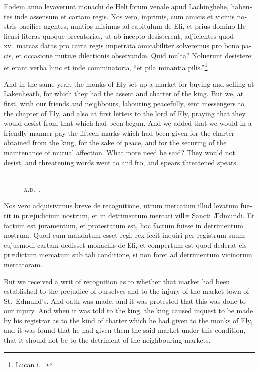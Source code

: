 \documentclass[10pt]{book}
\newcommand{\blockhead}[4][]{
\begin{figure}
\centering
\vspace{#4}
\parbox{2.75cm}{\begin{center}\footnotesize \color{BrickRed} \emph{#2}\\ #1 \end{center}}
\end{figure}
}
\begin{document}
\begin{paracol}{2}
\switchcolumn*

\begin{otherlanguage}{latin}
Eodem anno levaverunt monachi de Heli forum venale apud Lachinghehe, habentes inde assensum et cartam regis. Nos vero, inprimis, cum amicis et vicinis nostris pacifice agentes, nuntios misimus ad capitulum de Eli, et prius domino Heliensi literas quoque precatorias, ut ab incepto desisterent, adjicientes quod xv.\ marcas datas pro carta regis impetrata amicabiliter solveremus pro bono pacis, et occasione mutu\ae{} dilectionis observand\ae{}. Quid multa? Noluerunt desistere; et erant verba hinc et inde comminatoria, ``et pila minantia pilis.''\footnote[\textdagger]{Lucan i.\ .}
\end{otherlanguage}

\switchcolumn

And in the same year, the monks of Ely set up a market for buying and selling at Lakenheath, for which they had the assent and charter of the king. But we, at first, with our friends and neighbours, labouring peacefully, sent messengers to the chapter of Ely, and also at first letters to the lord of Ely, praying that they would desist from that which had been begun. And we added that we would in a friendly manner pay the fifteen marks which had been given for the charter obtained from the king, for the sake of peace, and for the securing of the maintenance of mutual affection. What more need be said? They would not desist, and threatening words went to and fro, and spears threatened spears.

\switchcolumn*

\begin{otherlanguage}{latin}
\blockhead[\textsc{a.d}.\ .]{}{2}{-.65cm}
Nos vero adquisivimus breve de recognitione, utrum mercatum illud levatum fuerit in pr\ae{}judicium nostrum, et in detrimentum mercati vill\ae{} Sancti \AE{}dmundi. Et factum est juramentum, et protestatum est, hoc factum fuisse in detrimentum nostrum. Quod cum mandatum esset regi, rex fecit inquiri per registrum suum cujusmodi cartam dedisset monachis de Eli, et compertum est quod dederat eis pr\ae{}dictum mercatum sub tali conditione, si non foret ad detrimentum vicinorum mercatoram.

\end{otherlanguage}

\switchcolumn

But we received a writ of recognition as to whether that market had been established to the prejudice of ourselves and to the injury of the market town of St.\ Edmund's. And oath was made, and it was protested that this was done to our injury. And when it was told to the king, the king caused inquest to be made by his registrar as to the kind of charter which he had given to the monks of Ely, and it was found that he had given them the said market under this condition, that it should not be to the detriment of the neighbouring markets.


\end{paracol}
\end{document}
